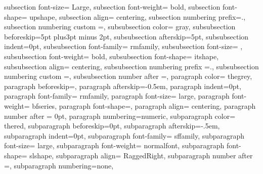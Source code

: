 {{       subsection font-size= Large,
       subsection font-weight= bold,
       subsection font-shape= upshape,
       subsection align= centering,
       subsection numbering prefix=\thesection.,%
       subsection numbering custom =\@arabic\c@subsection,%
       subsubsection color= gray,
       subsubsection beforeskip=5pt plus3pt minus 2pt,
       subsubsection afterskip=5pt,
       subsubsection indent=0pt,
       subsubsection font-family= rmfamily,
       subsubsection font-size= \large,  %
       subsubsection font-weight= bold,
       subsubsection font-shape= itshape,
       subsubsection align= centering,
       subsubsection numbering prefix =\thesubsection.\@arabic\c@subsubsection,
       subsubsection numbering custom =, %
       subsubsection number after =, 
%
       paragraph color= thegrey,
       paragraph beforeskip=,
       paragraph afterskip=-0.5em,
       paragraph indent=0pt,
       paragraph font-family= rmfamily,
       paragraph font-size= large,
       paragraph font-weight= bfseries,
       paragraph font-shape=,
       paragraph align= centering,
       paragraph number after = 0pt,
       paragraph numbering=numeric,
       subparagraph color= thered,
       subparagraph beforeskip=0pt,
       subparagraph afterskip=-.5em,
       subparagraph indent=0pt,
       subparagraph font-family= sffamily,
       subparagraph font-size= large,
       subparagraph font-weight= normalfont,
       subparagraph font-shape= slshape,
       subparagraph align= RaggedRight,
       subparagraph number after =, %
       subparagraph numbering=none,
     }
}

